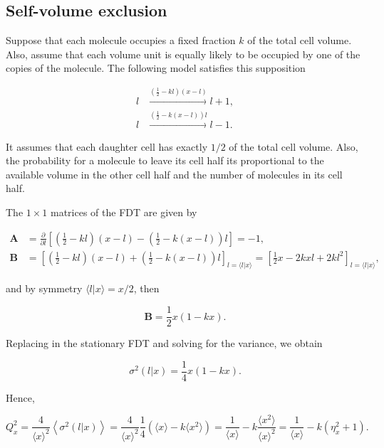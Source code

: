 \subsection{Self-volume exclusion}

Suppose that each molecule occupies a fixed fraction $k$ of the total cell volume. Also, assume that each volume unit is equally likely to be occupied by one of the copies of the molecule. The following model satisfies this supposition

\begin{equation*}
  \begin{split}
  l&\xrightarrow{(\frac{1}{2}-kl)(x-l)}l+1,\\
  l&\xrightarrow{(\frac{1}{2}-k(x-l))l}l-1.
  \end{split}
\end{equation*}

It assumes that each daughter cell has exactly $1/2$ of the total cell volume. Also, the probability for a molecule to leave its cell half its proportional to the available volume in the other cell half and the number of molecules in its cell half.

The $1\times 1$ matrices of the FDT are given by

\begin{equation*}
  \begin{split}
  \mathbf{A}&=\frac{\partial}{\partial l}\left[\left(\frac{1}{2}-kl\right)\left(x-l\right)-\left(\frac{1}{2}-k\left(x-l\right)\right)l\right]=-1,\\
  \mathbf{B}&=\left[\left(\frac{1}{2}-kl\right)\left(x-l\right)+\left(\frac{1}{2}-k\left(x-l\right)\right)l\right]_{l=\langle l|x\rangle} = \left[\frac{1}{2}x-2kxl+2kl^2\right]_{l=\langle l|x\rangle},
  \end{split}
\end{equation*}

and by symmetry $\langle l|x\rangle = x/2$, then

\begin{equation*}
  \mathbf{B} = \frac{1}{2}x(1-kx).
\end{equation*}

Replacing in the stationary FDT and solving for the variance, we obtain

\begin{equation*}
  \sigma^2(l|x) = \frac{1}{4}x(1-kx).
\end{equation*}

Hence,

\begin{equation}
  Q_x^2 = \frac{4}{\langle x\rangle^2}\left\langle \sigma^2(l|x)\right\rangle = \frac{4}{\langle x\rangle^2}\frac{1}{4}\left(\langle x\rangle-k\langle x^2\rangle\right) = \frac{1}{\langle x\rangle} - k\frac{\langle x^2\rangle}{\langle x\rangle^2} = \frac{1}{\langle x\rangle} - k(\eta_x^2+1).
\end{equation}

